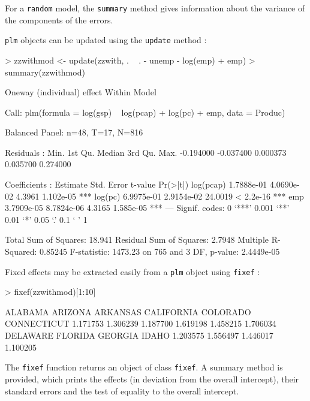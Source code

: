 \documentclass[a4paper]{article}
\begin{document}
For a \texttt{random} model, the \texttt{summary} method gives
information about the variance of the components of the errors.

\texttt{plm} objects can be updated using the \texttt{update} method :

\begin{Schunk}
\begin{Sinput}
> zzwithmod <- update(zzwith, . ~ . - unemp - log(emp) + emp)
> summary(zzwithmod)
\end{Sinput}
\begin{Soutput}
Oneway (individual) effect Within Model

Call:
plm(formula = log(gsp) ~ log(pcap) + log(pc) + emp, data = Produc)

Balanced Panel: n=48, T=17, N=816

Residuals :
     Min.   1st Qu.    Median   3rd Qu.      Max. 
-0.194000 -0.037400  0.000373  0.035700  0.274000 

Coefficients :
            Estimate Std. Error t-value  Pr(>|t|)    
log(pcap) 1.7888e-01 4.0690e-02  4.3961 1.102e-05 ***
log(pc)   6.9975e-01 2.9154e-02 24.0019 < 2.2e-16 ***
emp       3.7909e-05 8.7824e-06  4.3165 1.585e-05 ***
---
Signif. codes:  0 ‘***’ 0.001 ‘**’ 0.01 ‘*’ 0.05 ‘.’ 0.1 ‘ ’ 1 

Total Sum of Squares: 18.941
Residual Sum of Squares: 2.7948
Multiple R-Squared: 0.85245
F-statistic: 1473.23 on 765 and 3 DF, p-value: 2.4449e-05
\end{Soutput}
\end{Schunk}

Fixed effects may be extracted easily from a \texttt{plm} object using
\texttt{fixef} :

\begin{Schunk}
\begin{Sinput}
> fixef(zzwithmod)[1:10]
\end{Sinput}
\begin{Soutput}
    ALABAMA     ARIZONA    ARKANSAS  CALIFORNIA    COLORADO CONNECTICUT 
   1.171753    1.306239    1.187700    1.619198    1.458215    1.706034 
   DELAWARE     FLORIDA     GEORGIA       IDAHO 
   1.203575    1.556497    1.446017    1.100205 
\end{Soutput}
\end{Schunk}

The \texttt{fixef} function returns an object of class \texttt{fixef}. A
summary method is provided, which prints the effects (in deviation
from the overall intercept), their standard
errors and the test of equality to the overall intercept.
\end{document}
